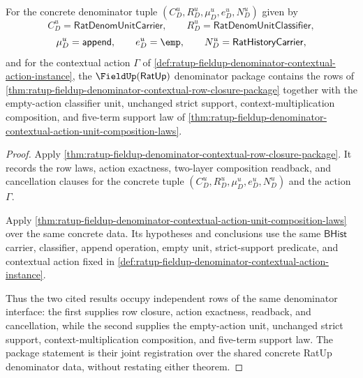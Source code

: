 \begin{theorem}
\label{thm:ratup-fieldup-denominator-contextual-row-package-with-unit-composition}
For the concrete denominator tuple
$(C_D^u,R_D^u,\mu_D^u,e_D^u,N_D^u)$ given by
$$
C_D^u=\mathsf{RatDenomUnitCarrier},\qquad
R_D^u=\mathsf{RatDenomUnitClassifier},
$$
$$
\mu_D^u=\mathsf{append},\qquad
e_D^u=\emp,\qquad
N_D^u=\mathsf{RatHistoryCarrier},
$$
and for the contextual action $\Gamma$ of
\autoref{def:ratup-fieldup-denominator-contextual-action-instance}, the
$\FieldUp(\mathsf{RatUp})$ denominator package contains the rows of
\autoref{thm:ratup-fieldup-denominator-contextual-row-closure-package}
together with the empty-action classifier unit, unchanged strict support,
context-multiplication composition, and five-term support law of
\autoref{thm:ratup-fieldup-denominator-contextual-action-unit-composition-laws}.
\end{theorem}
\begin{proof}
Apply
\autoref{thm:ratup-fieldup-denominator-contextual-row-closure-package}. It
records the row laws, action exactness, two-layer composition readback, and
cancellation clauses for the concrete tuple
$(C_D^u,R_D^u,\mu_D^u,e_D^u,N_D^u)$ and the action $\Gamma$.

Apply
\autoref{thm:ratup-fieldup-denominator-contextual-action-unit-composition-laws}
over the same concrete data. Its hypotheses and conclusions use the same
$\mathsf{BHist}$ carrier, classifier, append operation, empty unit,
strict-support predicate, and contextual action fixed in
\autoref{def:ratup-fieldup-denominator-contextual-action-instance}.

Thus the two cited results occupy independent rows of the same denominator
interface: the first supplies row closure, action exactness, readback, and
cancellation, while the second supplies the empty-action unit, unchanged strict
support, context-multiplication composition, and five-term support law. The
package statement is their joint registration over the shared concrete RatUp
denominator data, without restating either theorem.
\end{proof}

